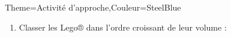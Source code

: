 \begin{Maquette}[Cours]{Theme={Activité d'approche},Couleur={SteelBlue}}
\begin{AActivite}
\begin{enumerate}
\begin{multicols}{6}
                     $e = \dfrac{\pointilles[1cm]}{8} u$ \par \vskip8mm
                     $k = \dfrac{\pointilles[1cm]}{8} u$ \par \vskip8mm
                     $f = \dfrac{\pointilles[1cm]}{8} u$ \par \vskip8mm
                  \end{multicols} \vskip8mm
               \item Classer les Lego® dans l'ordre croissant de leur volume : \par \vskip5mm
                  \pointilles \par \vskip7mm
                  \pointilles \par \bigskip
         \end{enumerate}

   \end{AActivite}

\end{Maquette}


